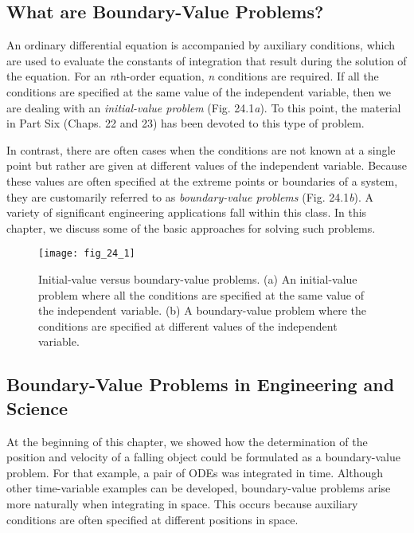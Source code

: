 \documentclass[../main.tex]{subfiles}
\begin{document}
\subsection{What are Boundary-Value Problems?}

\noindent An ordinary differential equation is accompanied by auxiliary conditions, which are used
to evaluate the constants of integration that result during the solution of the equation. For
an \textit{n}th-order equation, \textit{n} conditions are required. If all the conditions are specified at the same value of the independent variable, then we are dealing with an \textit{initial-value problem} (Fig. 24.1\textit{a}). To this point, the material in Part Six (Chaps. 22 and 23) has been devoted to
this type of problem.

In contrast, there are often cases when the conditions are not known at a single point
but rather are given at different values of the independent variable. Because these values
are often specified at the extreme points or boundaries of a system, they are customarily
referred to as \textit{boundary-value problems} (Fig. 24.1\textit{b}). A variety of significant engineering applications fall within this class. In this chapter, we discuss some of the basic approaches for solving such problems.

\begin{figure}[H]
    \centering
    \texttt{[image: fig\_24\_1]}
   \caption{\textsf{Initial-value versus boundary-value problems. (a) An initial-value problem where all the conditions
   are specified at the same value of the independent variable. (b) A boundary-value problem
   where the conditions are specified at different values of the independent variable.}}\label{fig:fig_24_1}
\end{figure}

\subsection{Boundary-Value Problems in Engineering and Science}

\noindent At the beginning of this chapter, we showed how the determination of the position and velocity of a falling object could be formulated as a boundary-value problem. For that example, a pair of ODEs was integrated in time. Although other time-variable examples can be
developed, boundary-value problems arise more naturally when integrating in space. This
occurs because auxiliary conditions are often specified at different positions in space.
\end{document}
